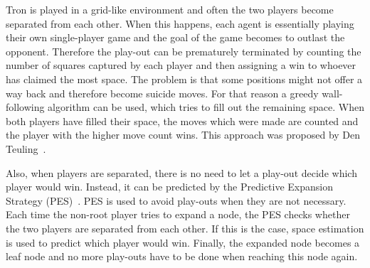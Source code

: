 \documentclass{article}
\begin{document}





Tron is played in a grid-like environment and often the two players become separated from each other. When this happens, each agent is essentially playing their own single-player game and the goal of the game becomes to outlast the opponent. Therefore the play-out can be prematurely terminated by counting the number of squares captured by each player and then assigning a win to whoever has claimed the most space. The problem is that some positions might not offer a way back and therefore become suicide moves. For that reason a greedy wall-following algorithm can be used, which tries to fill out the remaining space. When both players have filled their space, the moves which were made are counted and the player with the higher move count wins. This approach was proposed by Den Teuling~\cite{teuling_tron}. %

Also, when players are separated, there is no need to let a play-out decide which player would win. Instead, it can be predicted by the Predictive Expansion Strategy (PES)~\cite{teuling_tron}. PES is used to avoid play-outs when they are not necessary. Each time the non-root player tries to expand a node, the PES checks whether the two players are separated from each other. If this is the case, space estimation is used to predict which player would win. Finally, the expanded node becomes a leaf node and no more play-outs have to be done when reaching this node again. 
\end{document}
